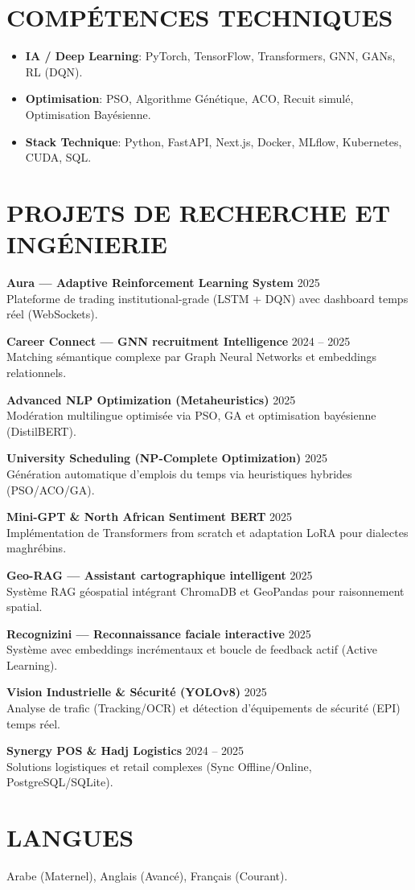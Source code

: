 \documentclass[a4paper,11pt]{article}
\begin{document}
\section{COMPÉTENCES TECHNIQUES}
\begin{itemize}
    \item \textbf{IA / Deep Learning}: PyTorch, TensorFlow, Transformers, GNN, GANs, RL (DQN).
    \item \textbf{Optimisation}: PSO, Algorithme Génétique, ACO, Recuit simulé, Optimisation Bayésienne.
    \item \textbf{Stack Technique}: Python, FastAPI, Next.js, Docker, MLflow, Kubernetes, CUDA, SQL.
\end{itemize}

\section{PROJETS DE RECHERCHE ET INGÉNIERIE}

\textbf{Aura — Adaptive Reinforcement Learning System} \hfill 2025 \\
Plateforme de trading institutional-grade (LSTM + DQN) avec dashboard temps réel (WebSockets).

\textbf{Career Connect — GNN recruitment Intelligence} \hfill 2024 -- 2025 \\
Matching sémantique complexe par Graph Neural Networks et embeddings relationnels.

\textbf{Advanced NLP Optimization (Metaheuristics)} \hfill 2025 \\
Modération multilingue optimisée via PSO, GA et optimisation bayésienne (DistilBERT).

\textbf{University Scheduling (NP-Complete Optimization)} \hfill 2025 \\
Génération automatique d'emplois du temps via heuristiques hybrides (PSO/ACO/GA).

\textbf{Mini-GPT \& North African Sentiment BERT} \hfill 2025 \\
Implémentation de Transformers from scratch et adaptation LoRA pour dialectes maghrébins.

\textbf{Geo-RAG — Assistant cartographique intelligent} \hfill 2025 \\
Système RAG géospatial intégrant ChromaDB et GeoPandas pour raisonnement spatial.

\textbf{Recognizini — Reconnaissance faciale interactive} \hfill 2025 \\
Système avec embeddings incrémentaux et boucle de feedback actif (Active Learning).

\textbf{Vision Industrielle \& Sécurité (YOLOv8)} \hfill 2025 \\
Analyse de trafic (Tracking/OCR) et détection d'équipements de sécurité (EPI) temps réel.

\textbf{Synergy POS \& Hadj Logistics} \hfill 2024 -- 2025 \\
Solutions logistiques et retail complexes (Sync Offline/Online, PostgreSQL/SQLite).

\section{LANGUES}
Arabe (Maternel), Anglais (Avancé), Français (Courant).
\end{document}
